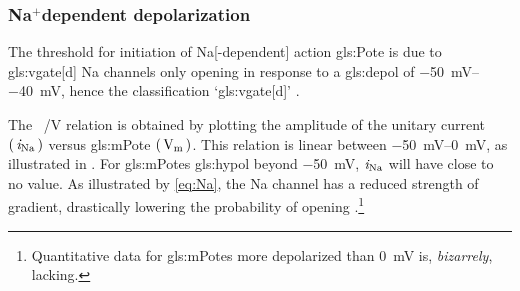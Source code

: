 \documentclass[class={myRUCProject}, crop=false]{standalone}
\begin{document}
\subsubsection{ Na\(^+\)dependent depolarization }\label{sec:depol}
The threshold for initiation of \gls{Na}[-dependent] action \gls{gls:Pote} is due to \gls{gls:vgate}[d] \gls{Na} channels only opening in response to a \gls{gls:depol} of \qtyrange{-50}{-40}{\mV}, hence the classification `\gls{gls:vgate}[d]' \cite{Hammond2015ch4}. 


The \unit[per-mode = symbol]{\ucur\sodium\per\V} relation is obtained by plotting the amplitude of the unitary current \(\left(\,\mathit{i}_\mathrm{Na}\,\right)\) versus \gls{gls:mPote} \(\br{\unit{\V\membrane}}\). This relation is linear between \qtyrange{-50}{0}{\mV}, as illustrated in \textbf{}. For \glspl{gls:mPote} \gls{gls:hypol} beyond \qty{-50}{\mV}, \(\mathit{i}_\mathrm{Na}\) will have close to no value. As illustrated by \cref{eq:Na}, the \gls{Na} channel has a reduced strength of gradient, drastically lowering the probability of opening \cite{Hammond2015ch4}.\footnote{Quantitative data for \glspl{gls:mPote} more depolarized than \qty{0}{\mV} is, \emph{bizarrely}, lacking.}
\end{document}
